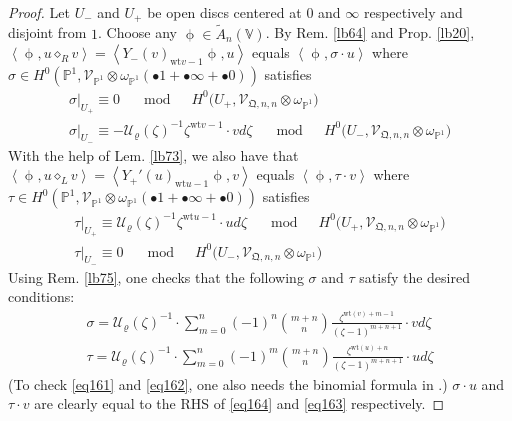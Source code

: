 \documentclass[11pt,b5paper,notitlepage]{article}
\theoremstyle{definition}
\theoremstyle{plain}
\newcommand{\mc}{\mathcal}
\newcommand{\wtd}{\widetilde}
\newcommand{\scr}{\mathscr}
\newcommand{\blt}{\bullet}
\newcommand{\Vbb}{\mathbb V}
\newcommand{\Pbb}{\mathbb P}
\newcommand{\wt}{\mathrm{wt}}
\newcommand{\<}{\left\langle}
\renewcommand{\>}{\right\rangle}
\newcommand{\fq}{{\mathfrak Q}}
\numberwithin{equation}{subsection}
\begin{document}
\begin{proof}
Let $U_-$ and $U_+$ be open discs centered at $0$ and $\infty$ respectively and disjoint from $1$. Choose any $\upphi\in\wtd A_n(\Vbb)$. By Rem. \ref{lb64} and Prop. \ref{lb20}, $\<\upphi,u\diamond_R v\>=\<Y_-(v)_{\wt v-1}\upphi,u\>$ equals $\<\upphi,\sigma\cdot u\>$ where $\sigma\in H^0(\Pbb^1,\scr V_{\Pbb^1}\otimes\omega_{\Pbb^1}(\blt 1+\blt\infty+\blt 0))$ satisfies
\begin{subequations}
\begin{gather}
\sigma\big|_{U_+}\equiv 0\quad\mod\quad H^0\big(U_+,\scr V_{\fq,n,n}\otimes\omega_{\Pbb^1}\big)\\
\sigma\big|_{U_-}\equiv -\mc U_\varrho(\zeta)^{-1} \zeta^{\wt v-1}\cdot  v d\zeta\quad\mod\quad H^0\big(U_-,\scr V_{\fq,n,n}\otimes\omega_{\Pbb^1}\big)  \label{eq161}
\end{gather}
\end{subequations}
With the help of Lem. \ref{lb73}, we also have that $\<\upphi,u\diamond_L v\>=\<Y_+'(u)_{\wt u-1}\upphi,v\>$ equals $\<\upphi,\tau\cdot v\>$ where $\tau\in H^0(\Pbb^1,\scr V_{\Pbb^1}\otimes\omega_{\Pbb^1}(\blt 1+\blt \infty+\blt 0))$ satisfies
\begin{subequations}
\begin{gather}
\tau\big|_{U_+}\equiv \mc U_\varrho(\zeta)^{-1} \zeta^{\wt u-1}\cdot u   d\zeta\quad\mod\quad H^0\big(U_+,\scr V_{\fq,n,n}\otimes\omega_{\Pbb^1}\big)  \label{eq162}\\
\tau\big|_{U_-}\equiv 0\quad\mod\quad H^0\big(U_-,\scr V_{\fq,n,n}\otimes\omega_{\Pbb^1}\big)
\end{gather}
\end{subequations}
Using Rem. \ref{lb75}, one checks that the following $\sigma$ and $\tau$ satisfy the desired conditions:
\begin{subequations}
\begin{gather}
\sigma=\mc U_\varrho(\zeta)^{-1}\cdot \sum_{m=0}^n(-1)^n \binom{m+n}{n}\frac{\zeta^{\wt(v)+m-1}}{(\zeta-1)^{m+n+1}} \cdot vd\zeta\\
\tau=\mc U_\varrho(\zeta)^{-1}\cdot \sum_{m=0}^n (-1)^m \binom{m+n}{n}\frac{\zeta^{\wt(u)+n}}{(\zeta-1)^{m+n+1}}\cdot ud\zeta
\end{gather}
\end{subequations}
(To check \eqref{eq161} and \eqref{eq162}, one also needs the binomial formula in \cite[Prop. 5.2]{DLM-Zhu}.) $\sigma\cdot u$ and $\tau\cdot v$ are clearly equal to the RHS of \eqref{eq164} and \eqref{eq163} respectively.
\end{proof}
\end{document}
